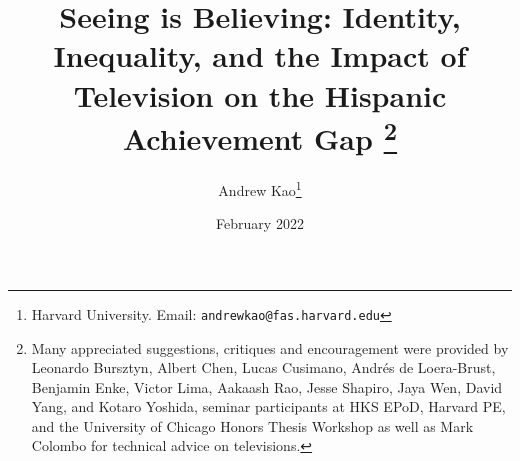 \documentclass[11pt]{article}
\begin{document}
\title{\textbf{Seeing is Believing: Identity, Inequality, and the Impact of Television on the Hispanic Achievement Gap}%
\thanks{Many appreciated suggestions, critiques and encouragement were provided by Leonardo Bursztyn, Albert Chen, Lucas Cusimano, Andrés de Loera-Brust, Benjamin Enke, Victor Lima, Aakaash Rao, Jesse Shapiro, Jaya Wen, David Yang, and Kotaro Yoshida, seminar participants at HKS EPoD, Harvard PE, and the University of Chicago Honors Thesis Workshop as well as Mark Colombo for technical advice on televisions. }\\
}



\author{Andrew Kao\thanks{Harvard University. Email: \texttt{andrewkao@fas.harvard.edu}} }

\date{February 2022}
{\vspace{-5ex}}


\maketitle
\end{document}
